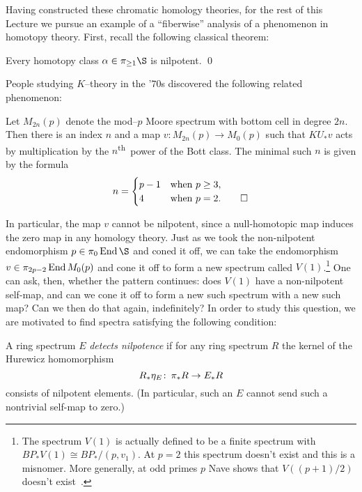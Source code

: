 Having constructed these chromatic homology theories, for the rest of this Lecture we pursue an example of a ``fiberwise'' analysis of a phenomenon in homotopy theory.  First, recall the following classical theorem:

\begin{theorem}
Every homotopy class $\alpha \in \pi_{\ge 1} \S$ is nilpotent. \qed
\end{theorem}

\noindent People studying $K$--theory in the '$70$s discovered the following related phenomenon:

\begin{theorem}\label{AdamsSelfMapThm}
Let $M_{2n}(p)$ denote the mod--$p$ Moore spectrum with bottom cell in degree $2n$.  Then there is an index $n$ and a map $v: M_{2n}(p) \to M_0(p)$ such that $KU_* v$ acts by multiplication by the $n$\textsuperscript{th}\, power of the Bott class.  The minimal such $n$ is given by the formula \[n = \begin{cases} p-1 & \text{when $p \ge 3$}, \\ 4 & \text{when $p = 2$}. \qed \end{cases}\]
\end{theorem}

\noindent In particular, the map $v$ cannot be nilpotent, since a null-homotopic map induces the zero map in any homology theory.  Just as we took the non-nilpotent endomorphism $p \in \pi_0 \End \S$ and coned it off, we can take the endomorphism $v \in \pi_{2p-2} \operatorname{End} M_0(p)$ and cone it off to form a new spectrum called $V(1)$.\footnote{The spectrum $V(1)$ is actually defined to be a finite spectrum with $BP_* V(1) \cong BP_* / (p, v_1)$. At $p = 2$ this spectrum doesn't exist and this is a misnomer.  More generally, at odd primes $p$ Nave shows that $V((p+1)/2)$ doesn't exist~\cite[Theorem 1.3]{Nave}.}  One can ask, then, whether the pattern continues: does $V(1)$ have a non-nilpotent self-map, and can we cone it off to form a new such spectrum with a new such map?  Can we then do that again, indefinitely?  In order to study this question, we are motivated to find spectra satisfying the following condition:

\begin{definition}
A ring spectrum $E$ \textit{detects nilpotence} if for any ring spectrum $R$ the kernel of the Hurewicz homomorphism \[R_*\eta_E\colon\thinspace \pi_* R \to E_* R\] consists of nilpotent elements.  (In particular, such an $E$ cannot send such a nontrivial self-map to zero.)
\end{definition}

